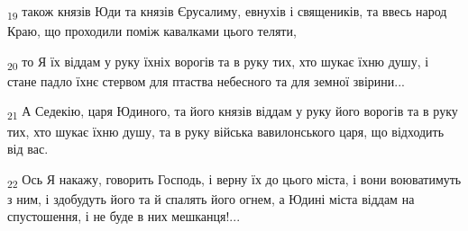 \begin{tcolorbox}
\textsubscript{19} також князів Юди та князів Єрусалиму, евнухів і священиків, та ввесь народ Краю, що проходили поміж кавалками цього теляти,
\end{tcolorbox}
\begin{tcolorbox}
\textsubscript{20} то Я їх віддам у руку їхніх ворогів та в руку тих, хто шукає їхню душу, і стане падло їхнє стервом для птаства небесного та для земної звірини...
\end{tcolorbox}
\begin{tcolorbox}
\textsubscript{21} А Седекію, царя Юдиного, та його князів віддам у руку його ворогів та в руку тих, хто шукає їхню душу, та в руку війська вавилонського царя, що відходить від вас.
\end{tcolorbox}
\begin{tcolorbox}
\textsubscript{22} Ось Я накажу, говорить Господь, і верну їх до цього міста, і вони воюватимуть з ним, і здобудуть його та й спалять його огнем, а Юдині міста віддам на спустошення, і не буде в них мешканця!...
\end{tcolorbox}
